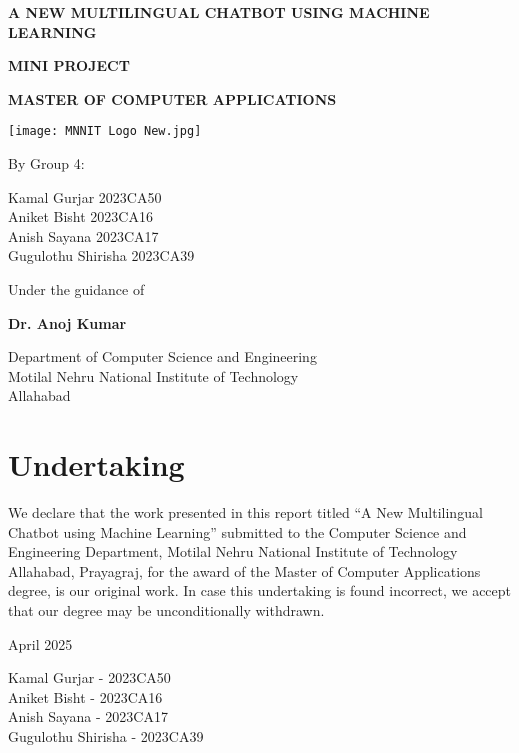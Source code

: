 \documentclass[12pt]{report}
\begin{document}
\begin{titlepage}
    \centering
    \vspace*{2cm}
    {\fontsize{16}{22}\selectfont\bfseries A NEW MULTILINGUAL CHATBOT USING MACHINE LEARNING\par}
    \vspace{2cm}
    {\fontsize{16}{22}\selectfont\bfseries MINI PROJECT\par}

    \vspace{2cm}
     {\fontsize{16}{22}\selectfont\bfseries MASTER OF COMPUTER APPLICATIONS\par}
    \vfill
    \texttt{[image: MNNIT Logo New.jpg]}
    \\
    {\large By Group 4:\par}
    \vspace{0.5cm}
    {\large Kamal Gurjar 2023CA50\\
    Aniket Bisht 2023CA16\\
    Anish Sayana 2023CA17\\
    Gugulothu Shirisha 2023CA39\par}
    \vfill
    {\large Under the guidance of\par}
    {\Large \textbf{Dr. Anoj Kumar}\par}
    \vspace{1cm}
    Department of Computer Science and Engineering\\
    Motilal Nehru National Institute of Technology\\
    Allahabad
\end{titlepage}

\chapter*{Undertaking}
We declare that the work presented in this report titled ``A New Multilingual Chatbot using Machine Learning'' submitted to the Computer Science and Engineering Department, Motilal Nehru National Institute of Technology Allahabad, Prayagraj, for the award of the Master of Computer Applications degree, is our original work. In case this undertaking is found incorrect, we accept that our degree may be unconditionally withdrawn.

\vspace{2cm}
April 2025

\vspace{2cm} 
Kamal Gurjar - 2023CA50\\
Aniket Bisht - 2023CA16\\
Anish Sayana - 2023CA17\\
Gugulothu Shirisha - 2023CA39
\end{document}
